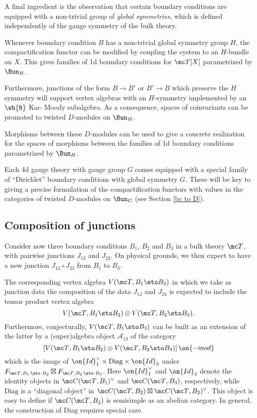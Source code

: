 \documentclass[11pt,reqno]{amsart}
\theoremstyle{plain}
\numberwithin{equation}{section}
\theoremstyle{definition}
\begin{document}
A final ingredient is the observation that certain boundary conditions
are equipped with a non-trivial group of {\it global symmetries},
which is defined independently of the gauge symmetry of the bulk
theory.

Whenever boundary condition $B$ has a non-trivial global symmetry
group $H$, the compactification functor can be modified by coupling
the system to an $H$-bundle on $X$.  This gives families of 1d
boundary conditions for ${\mc T}[X]$ parametrized by $\Bun_H$.

Furthermore, junctions of the form $B \to B'$ or $B' \to B$ which
preserve the $H$ symmetry will support vertex algebras with an
$H$-symmetry implemented by an $\wh{\mathfrak{h}}$ Kac--Moody
subalgebra. As a consequence, spaces of coinvariants can be promoted
to twisted $D$-modules on $\Bun_H$.

Morphisms between these $D$-modules can be used to give a concrete
realization for the spaces of morphisms between the families of 1d
boundary conditions parametrized by $\Bun_H$.

Each 4d gauge theory with gauge group $G$ comes equipped with a
special family of ``Dirichlet'' boundary conditions with global
symmetry $G$. These will be key to giving a precise formulation of the
compactification functors with values in the categories of twisted
$D$-modules on $\Bun_G$ (see Section \ref{bc to D}).

\subsection{Composition of junctions}    \label{comp junctions}

Consider now three boundary conditions $B_1$, $B_2$ and $B_3$ in a
bulk theory ${\mc T}$, with pairwise junctions $J_{12}$ and
$J_{23}$. On physical grounds, we then expect to have a new junction
$J_{12} \circ J_{23}$ from $B_1$ to $B_3$.

The corresponding vertex algebra $V({\mc T},B_1\sto B_3)$ in which we
take as junction data the composition of the data $J_{12}$ and
$J_{23}$ is expected to include the tensor product vertex algebra
$$
V({\mc T},B_1\sto B_2) \otimes V({\mc T},B_2\sto B_3).
$$
Furthermore, conjecturally, $V({\mc T},B_1\sto B_3)$ can be built as an extension of the latter by
a (super)algebra object ${\mathcal A}_{13}$ of the category
$$
\left[V({\mc T},B_1\sto B_2) \otimes V({\mc
    T},B_2\sto B_3) \right]\on{-mod}
$$
which is the image of $\on{Id}^\vee_1 \times \mathrm{Diag} \times
\on{Id}_3$ under $F_{{\mc T},B_1\, \sto \; B_2} \boxtimes F_{{\mc
    T},B_2\, \sto \; B_3}$. Here $\on{Id}^\vee_1$ and $\on{Id}_3$
denote the identity objects in ${\mc C}({\mc T},B_1)^\vee$ and ${\mc
  C}({\mc T},B_3)$, respectively, while $\mathrm{Diag}$ is a
``diagonal object'' in ${\mc C}({\mc T},B_2) \boxtimes {\mc C}({\mc
  T},B_2)^\vee$. This object is easy to define if ${\mc C}({\mc
  T},B_2)$ is semisimple as an abelian category. In general, the
construction of $\mathrm{Diag}$ requires special care.
\end{document}
